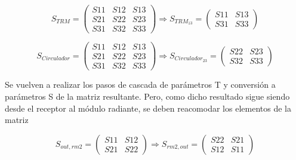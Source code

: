 $$
	S_{TRM} = \begin{pmatrix} S11&S12&S13 \\ S21&S22&S23 \\ S31&S32&S33\end{pmatrix} \Rightarrow
	S_{TRM_{13}} = \begin{pmatrix} S11&S13 \\ S31&S33 \end{pmatrix}
$$

$$
	S_{Circulador} = \begin{pmatrix} S11&S12&S13 \\ S21&S22&S23 \\ S31&S32&S33\end{pmatrix} \Rightarrow
	S_{Circulador_{23}} = \begin{pmatrix} S22&S23 \\ S32&S33 \end{pmatrix}
$$

Se vuelven a realizar los pasos de cascada de parámetros T y conversión a parámetros S de la matriz resultante. Pero, como
dicho resultado sigue siendo desde el receptor al módulo radiante, se deben reacomodar los elementos de la matriz

$$
	S_{out,rm2} = \begin{pmatrix} S11&S12 \\ S21&S22\end{pmatrix} \Rightarrow
	S_{rm2, out} = \begin{pmatrix} S22&S21 \\ S12&S11 \end{pmatrix}
$$
